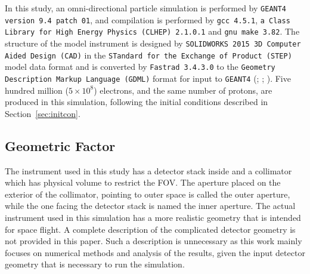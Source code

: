 \documentclass{jkas}
\begin{document}
In this study, an omni-directional particle simulation is performed by {\tt GEANT4 version 9.4 patch 01}, and compilation is performed by {\tt gcc 4.5.1}, {\tt a Class Library for High Energy Physics (CLHEP) 2.1.0.1} and {\tt gnu make 3.82}. The structure of the model instrument is designed by {\tt SOLIDWORKS 2015 3D Computer Aided Design (CAD)} in the {\tt STandard for the Exchange of Product (STEP)} model data format and is converted by {\tt Fastrad 3.4.3.0} to the {\tt Geometry Description Markup Language (GDML)} format for input to {\tt GEANT4} (\citealt{kim2012}; \citealt{poole2012}; \citealt{park2014}). Five hundred million ($5\times 10^8$) electrons, and the same number of protons, are produced in this simulation, following the initial conditions described in Section~\ref{sec:initcon}.

\subsection{Geometric Factor\label{sec:geofac}}

The instrument used in this study has a detector stack inside and a collimator which has physical volume to restrict the FOV. The aperture placed on the exterior of the collimator, pointing to outer space is called the outer aperture, while the one facing the detector stack is named the inner aperture. The actual instrument used in this simulation has a more realistic geometry that is intended for space flight. A complete description of the complicated detector geometry is not provided in this paper. Such a description is unnecessary as this work mainly focuses on numerical methods and analysis of the results, given the input detector geometry that is necessary to run the simulation.
\end{document}

